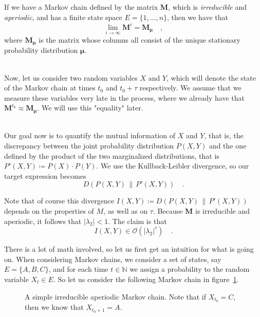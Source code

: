\documentclass[../../main.tex]{subfiles}
\begin{document}
    \noindent
    If we have a Markov chain defined by the matrix $\boldsymbol{M}$, which is \emph{irreducible} and \emph{aperiodic}, and has a finite state space $E = \{1, \dots, n\}$, then we have that
    \[
        \lim_{i \to \infty} \boldsymbol{M}^i = \boldsymbol{M}_{\boldsymbol{\mu}} \quad ,
    \]
    where $\boldsymbol{M_\mu}$ is the matrix whose columns all consist of the unique stationary probability distribution $\boldsymbol{\mu}$.

    ~\\
    Now, let us consider two random variables $X$ and $Y$, which will denote the state of the Markov chain at times $t_0$ and $t_0 + \tau$ respectively. We assume that we measure these variables very late in the process, where we already have that $\boldsymbol{M}^{t_0} \approx \boldsymbol{M}_{\boldsymbol{\mu}}$. We will use this "equality" later.

    ~\\
    Our goal now is to quantify the mutual information of $X$ and $Y$, that is, the discrepancy between the joint probability distribution $P(X, Y)$ and the one defined by the product of the two marginalized distributions, that is $P'(X, Y) \coloneqq P(X) \cdot P(Y)$. We use the Kullback-Leibler divergence, so our target expression becomes
    \[
        D(P(X, Y) \,\|\, P'(X, Y)) \quad .
    \]

    \smallskip \noindent
    Note that of course this divergence $I(X, Y) \coloneqq D(P(X, Y) \,\|\, P'(X, Y))$ depends on the properties of $M$, as well as on $\tau$. Because $\boldsymbol{M}$ is irreducible and aperiodic, it follows that $|\lambda_2| < 1$. The claim is that
    \[
        I(X, Y) \in \mathcal{O}(|\lambda_2|^\tau) \quad .
    \]
    
    \bigskip \noindent
    There is a lot of math involved, so let us first get an intuition for what is going on. When considering Markov chains, we consider a set of states, say $E = \{A, B, C\}$, and for each time $t \in \mathbb{N}$ we assign a probability to the random variable $X_t \in E$. So let us consider the following Markov chain in figure~\ref{fig:markov_chain}.

    \begin{figure}[h]
    \center
    \caption{A simple irreducible aperiodic Markov chain. Note that if $X_{t_0} = C$, then we know that $X_{t_0+1} = A$.}
    \label{fig:markov_chain}
    \end{figure}
\end{document}
